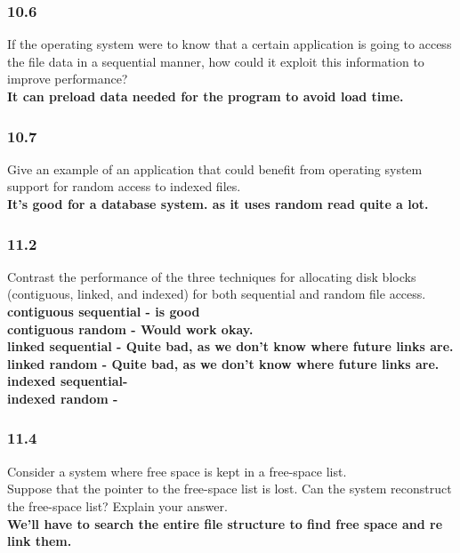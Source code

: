 \documentclass[a4paper,10pt,titlepage]{report}
\begin{document}
\subsubsection{10.6}
 If the operating system were to know that a certain application is going to access the file data in a sequential manner, how could it exploit this information to improve performance? \\
\hspace{15mm} \textbf{It can preload data needed for the program to avoid load time.} \\


\subsubsection{10.7}
Give an example of an application that could benefit from operating system support for random access to indexed files.\\
\hspace{15mm} \textbf{ It's good for a database system. as it uses random read quite a lot. } \\


\subsubsection{11.2}
Contrast the performance of the three techniques for allocating disk blocks (contiguous, linked, and indexed) for both sequential and random file access.\\
\hspace{15mm} \textbf{contiguous sequential	- is good} \\
\hspace{15mm} \textbf{contiguous random	- Would work okay.} \\
\hspace{15mm} \textbf{linked sequential	- Quite bad, as we don't know where future links are.} \\
\hspace{15mm} \textbf{linked random		- Quite bad, as we don't know where future links are. } \\
\hspace{15mm} \textbf{indexed sequential-  } \\
\hspace{15mm} \textbf{indexed random	- } \\


\subsubsection{11.4}
Consider a system where free space is kept in a free-space list.\\
\hspace{10mm}	Suppose that the pointer to the free-space list is lost. Can the system reconstruct the free-space list? Explain your answer.\\
\hspace{15mm} \textbf{We'll have to search the entire file structure to find free space and re link them.} \\
\end{document}
